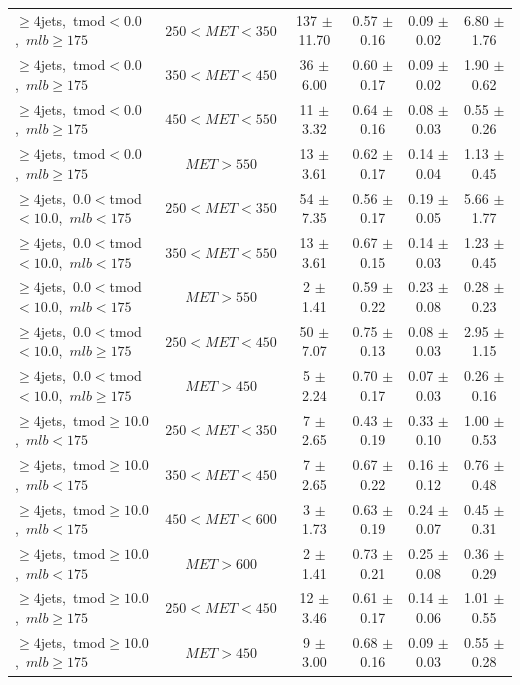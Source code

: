 \begin{table}
\begin{tabular}{|l|c|c|c|c|c|}
\hline
 $\ge4$jets,~tmod$<0.0$,~$mlb\ge175$ & $250<MET<350$  & 137 $\pm$ 11.70  & 0.57 $\pm$ 0.16  & 0.09 $\pm$ 0.02  & 6.80 $\pm$ 1.76  \\
 $\ge4$jets,~tmod$<0.0$,~$mlb\ge175$ & $350<MET<450$  & 36 $\pm$ 6.00  & 0.60 $\pm$ 0.17  & 0.09 $\pm$ 0.02  & 1.90 $\pm$ 0.62  \\
 $\ge4$jets,~tmod$<0.0$,~$mlb\ge175$ & $450<MET<550$  & 11 $\pm$ 3.32  & 0.64 $\pm$ 0.16  & 0.08 $\pm$ 0.03  & 0.55 $\pm$ 0.26  \\
 $\ge4$jets,~tmod$<0.0$,~$mlb\ge175$ & $MET>550$      & 13 $\pm$ 3.61  & 0.62 $\pm$ 0.17  & 0.14 $\pm$ 0.04  & 1.13 $\pm$ 0.45  \\
\hline
 $\ge4$jets,~$0.0<$tmod$<10.0$,~$mlb<175$ & $250<MET<350$  & 54 $\pm$ 7.35  & 0.56 $\pm$ 0.17  & 0.19 $\pm$ 0.05  & 5.66 $\pm$ 1.77  \\
 $\ge4$jets,~$0.0<$tmod$<10.0$,~$mlb<175$ & $350<MET<550$  & 13 $\pm$ 3.61  & 0.67 $\pm$ 0.15  & 0.14 $\pm$ 0.03  & 1.23 $\pm$ 0.45  \\
 $\ge4$jets,~$0.0<$tmod$<10.0$,~$mlb<175$ & $MET>550$      & 2 $\pm$ 1.41  & 0.59 $\pm$ 0.22  & 0.23 $\pm$ 0.08  & 0.28 $\pm$ 0.23  \\
\hline
 $\ge4$jets,~$0.0<$tmod$<10.0$,~$mlb\ge175$ & $250<MET<450$  & 50 $\pm$ 7.07  & 0.75 $\pm$ 0.13  & 0.08 $\pm$ 0.03  & 2.95 $\pm$ 1.15  \\
 $\ge4$jets,~$0.0<$tmod$<10.0$,~$mlb\ge175$ & $MET>450$      & 5 $\pm$ 2.24  & 0.70 $\pm$ 0.17  & 0.07 $\pm$ 0.03  & 0.26 $\pm$ 0.16  \\
\hline
 $\ge4$jets,~tmod$\ge10.0$,~$mlb<175$ & $250<MET<350$  & 7 $\pm$ 2.65  & 0.43 $\pm$ 0.19  & 0.33 $\pm$ 0.10  & 1.00 $\pm$ 0.53  \\
 $\ge4$jets,~tmod$\ge10.0$,~$mlb<175$ & $350<MET<450$  & 7 $\pm$ 2.65  & 0.67 $\pm$ 0.22  & 0.16 $\pm$ 0.12  & 0.76 $\pm$ 0.48  \\
 $\ge4$jets,~tmod$\ge10.0$,~$mlb<175$ & $450<MET<600$  & 3 $\pm$ 1.73  & 0.63 $\pm$ 0.19  & 0.24 $\pm$ 0.07  & 0.45 $\pm$ 0.31  \\
 $\ge4$jets,~tmod$\ge10.0$,~$mlb<175$ & $MET>600$      & 2 $\pm$ 1.41  & 0.73 $\pm$ 0.21  & 0.25 $\pm$ 0.08  & 0.36 $\pm$ 0.29  \\
\hline
 $\ge4$jets,~tmod$\ge10.0$,~$mlb\ge175$ & $250<MET<450$  & 12 $\pm$ 3.46  & 0.61 $\pm$ 0.17  & 0.14 $\pm$ 0.06  & 1.01 $\pm$ 0.55  \\
 $\ge4$jets,~tmod$\ge10.0$,~$mlb\ge175$ & $MET>450$      & 9 $\pm$ 3.00  & 0.68 $\pm$ 0.16  & 0.09 $\pm$ 0.03  & 0.55 $\pm$ 0.28  \\

\end{tabular}
\end{table}
